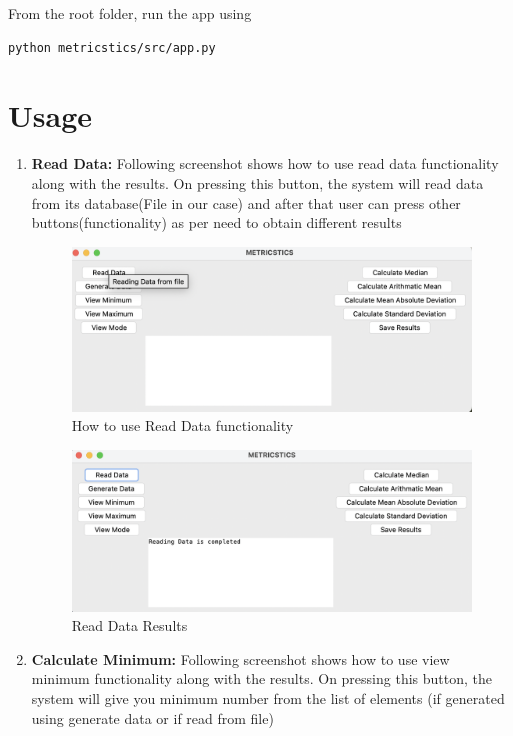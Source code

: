 \documentclass{article}
\begin{document}
From the root folder, run the app using

\begin{lstlisting}
python metricstics/src/app.py
\end{lstlisting}

\section{Usage}

\begin{enumerate}
    \item \textbf{Read Data:} Following screenshot shows how to use read data functionality along with the results. On pressing this button, the system will read data from its database(File in our case) and after that user can press other buttons(functionality) as per need to obtain different results
    \begin{figure}[h]
        \centering
        \includegraphics[width=0.9\linewidth]{ReadData.png}
        \caption{How to use Read Data functionality}
    \end{figure}
    \vspace{20em}
    \begin{figure}[h]
        \centering
        \includegraphics[width=0.9\linewidth]{ReadDataResults.png}
        \caption{Read Data Results}
    \end{figure}

    \item \textbf{Calculate Minimum:} Following screenshot shows how to use view minimum  functionality along with the results. On pressing this button, the system will give you minimum number from the list of elements (if generated using generate data or if read from file)


\end{enumerate}
\end{document}
